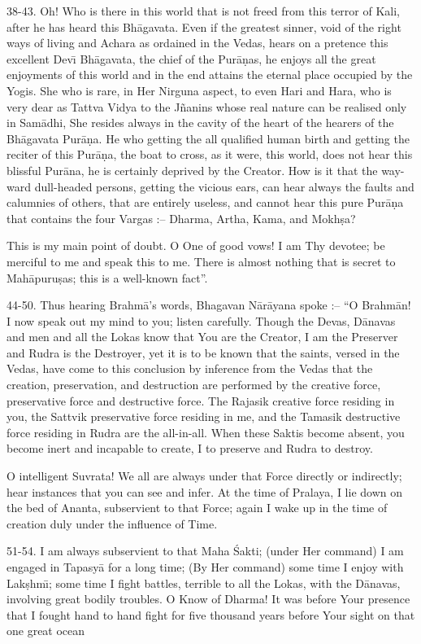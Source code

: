 38-43. Oh! Who is there in this world that is not freed from this terror of Kali, after he has heard this Bh\=agavata. Even if the greatest sinner, void of the right ways of living and Achara as ordained in the Vedas, hears on a pretence this excellent Dev\={\i} Bh\=agavata, the chief of the Pur\=a\d{n}as, he enjoys all the great enjoyments of this world and in the end attains the eternal place occupied by the Yogis. She who is rare, in Her Nirguna aspect, to even Hari and Hara, who is very dear as Tattva Vidya to the J\~nanins whose real nature can be realised only in Sam\=adhi, She resides always in the cavity of the heart of the hearers of the Bh\=agavata Pur\=a\d{n}a. He who getting the all qualified human birth and getting the reciter of this Pur\=a\d{n}a, the boat to cross, as it were, this world, does not hear this blissful Pur\=ana, he is certainly deprived by the Creator. How is it that the way-ward dull-headed persons, getting the vicious ears, can hear always the faults and calumnies of others, that are entirely useless, and cannot hear this pure Pur\=a\d{n}a that contains the four Vargas :-- Dharma, Artha, Kama, and Mokh\d{s}a?

This is my main point of doubt. O One of good vows! I am Thy devotee; be merciful to me and speak this to me. There is almost nothing that is secret to Mah\=apuru\d{s}as; this is a well-known fact''.

44-50. Thus hearing Brahm\=a's words, Bhagavan N\=ar\=ayana spoke :-- ``O Brahm\=an! I now speak out my mind to you; listen carefully. Though the Devas, D\=anavas and men and all the Lokas know that You are the Creator, I am the Preserver and Rudra is the Destroyer, yet it is to be known that the saints, versed in the Vedas, have come to this conclusion by inference from the Vedas that the creation, preservation, and destruction are performed by the creative force, preservative force and destructive force. The Rajasik creative force residing in you, the Sattvik preservative force residing in me, and the Tamasik destructive force residing in Rudra are the all-in-all. When these Saktis become absent, you become inert and incapable to create, I to preserve and Rudra to destroy.

O intelligent Suvrata! We all are always under that Force directly or indirectly; hear instances that you can see and infer. At the time of Pralaya, I lie down on the bed of Ananta, subservient to that Force; again I wake up in the time of creation duly under the influence of Time.

51-54. I am always subservient to that Maha \'Sakti; (under Her command) I am engaged in Tapasy\=a for a long time; (By Her command) some time I enjoy with Lak\d{s}hm\={\i}; some time I fight battles, terrible to all the Lokas, with the D\=anavas, involving great bodily troubles. O Know of Dharma! It was before Your presence that I fought hand to hand fight for five thousand years before Your sight on that one great ocean

